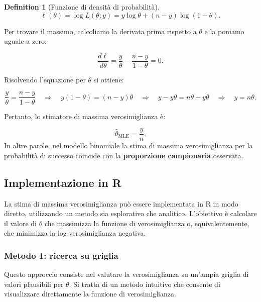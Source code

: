 \documentclass[
  letterpaper,
  DIV=11,
  numbers=noendperiod,
  oneside]{scrreprt}
\theoremstyle{definition}
\theoremstyle{plain}
\theoremstyle{definition}
\newtheorem{definition}{Definition}[chapter]
\theoremstyle{remark}
\begin{document}
\begin{definition}[Funzione di densità di
probabilità]
\[
\ell(\theta) = \log L(\theta; y) = y \log \theta + (n-y) \log(1-\theta).
\]

Per trovare il massimo, calcoliamo la derivata prima rispetto a
\(\theta\) e la poniamo uguale a zero:

\[
\frac{d\ell}{d\theta} = \frac{y}{\theta} - \frac{n-y}{1-\theta} = 0.
\]

Risolvendo l'equazione per \(\theta\) si ottiene:

\[
\frac{y}{\theta} = \frac{n-y}{1-\theta} \quad \Rightarrow \quad y(1-\theta) = (n-y)\theta \quad \Rightarrow \quad y - y\theta = n\theta - y\theta \quad \Rightarrow \quad y = n\theta.
\]

Pertanto, lo stimatore di massima verosimiglianza è:

\[
\hat{\theta}_{\text{MLE}} = \frac{y}{n}.
\] In altre parole, nel modello binomiale la stima di massima
verosimiglianza per la probabilità di successo coincide con la
\textbf{proporzione campionaria} osservata.

\subsection{Implementazione in R}\label{implementazione-in-r}

La stima di massima verosimiglianza può essere implementata in R in modo
diretto, utilizzando un metodo sia esplorativo che analitico.
L'obiettivo è calcolare il valore di \(\theta\) che massimizza la
funzione di verosimiglianza o, equivalentemente, che minimizza la
log-verosimiglianza negativa.

\subsubsection{Metodo 1: ricerca su
griglia}\label{metodo-1-ricerca-su-griglia}

Questo approccio consiste nel valutare la verosimiglianza su un'ampia
griglia di valori plausibili per \(\theta\). Si tratta di un metodo
intuitivo che consente di visualizzare direttamente la funzione di
verosimiglianza.


\end{definition}
\end{document}
